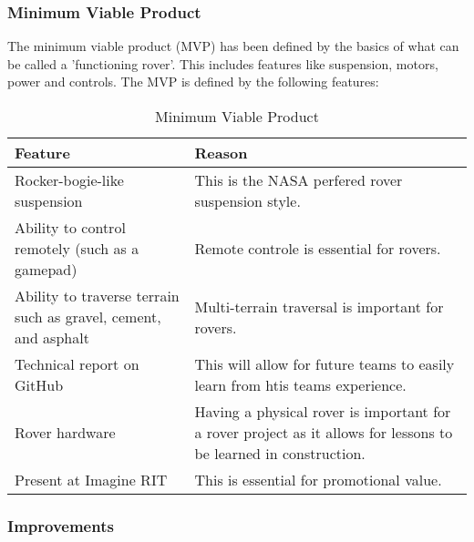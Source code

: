 \documentclass[conference]{IEEEtran} %
\begin{document}
\subsubsection{Minimum Viable Product}
The minimum viable product (MVP) has been defined by the basics of what can be called a 'functioning rover'. This includes features like suspension, motors, power and controls. The MVP is defined by the following features: 

\begin{table}[hb!]
    \caption{Minimum Viable Product}
    \centering
    \begin{tabularx}{\linewidth}{|L|L|} 
    \hline
    Feature & Reason \\
    \hline
    Rocker-bogie-like suspension & This is the NASA perfered rover suspension style. \\
    \hline
    Ability to control remotely (such as a gamepad) & Remote controle is essential for rovers. \\
    \hline
    Ability to traverse terrain such as gravel, cement, and asphalt & Multi-terrain traversal is important for rovers. \\
    \hline
    Technical report on GitHub & This will allow for future teams to easily learn from htis teams experience. \\
    \hline
    Rover hardware  & Having a physical rover is important for a rover project as it allows for lessons to be learned in construction. \\ 
    \hline
    Present at Imagine RIT & This is essential for promotional value. \\
    \hline
    \end{tabularx}
\label{tab:mvp-one}
\end{table}

\subsubsection{Improvements}
\end{document}
